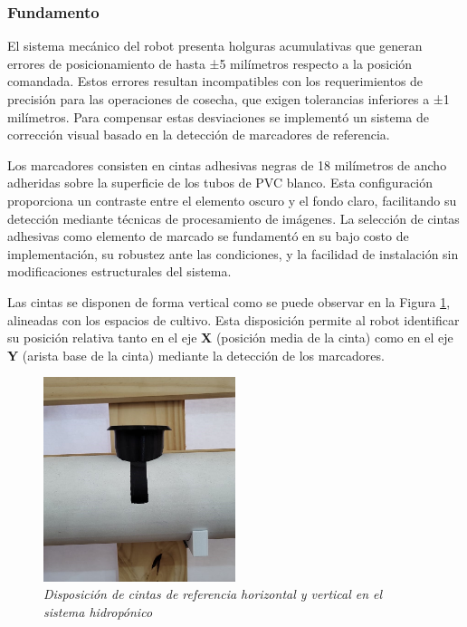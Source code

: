 \subsubsection{Fundamento}

El sistema mecánico del robot presenta holguras acumulativas que generan errores de posicionamiento de hasta ±5 milímetros respecto a la posición comandada. Estos errores resultan incompatibles con los requerimientos de precisión para las operaciones de cosecha, que exigen tolerancias inferiores a ±1 milímetros. Para compensar estas desviaciones se implementó un sistema de corrección visual basado en la detección de marcadores de referencia.

Los marcadores consisten en cintas adhesivas negras de 18 milímetros de ancho adheridas sobre la superficie de los tubos de PVC blanco. Esta configuración proporciona un contraste entre el elemento oscuro y el fondo claro, facilitando su detección mediante técnicas de procesamiento de imágenes. La selección de cintas adhesivas como elemento de marcado se fundamentó en su bajo costo de implementación, su robustez ante las condiciones, y la facilidad de instalación sin modificaciones estructurales del sistema.

Las cintas se disponen de forma vertical como se puede observar en la Figura \ref{fig:configuracion_cintas}, alineadas con los espacios de cultivo. Esta disposición permite al robot identificar su posición relativa tanto en el eje \textbf{X} (posición media de la cinta) como en el eje \textbf{Y} (arista base de la cinta) mediante la detección de los marcadores.

\begin{figure}[H]
\centering
\includegraphics[width=0.50\textwidth]{imagenes/configuracion_cintas_referencia.jpg}
\caption{\textit{Disposición de cintas de referencia horizontal y vertical en el sistema hidropónico}}
\label{fig:configuracion_cintas}
\end{figure}
